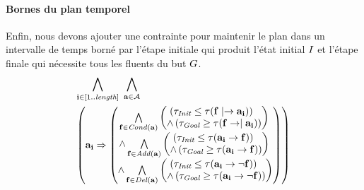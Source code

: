 \paragraph*{Bornes du plan temporel}
Enfin, nous devons ajouter une contrainte pour maintenir le plan dans un intervalle de temps born\'{e} par l'\'{e}tape initiale qui produit l'\'{e}tat initial $I$ et l'\'{e}tape finale qui n\'{e}cessite tous les fluents du but $G$.
\begin{small}
\begin{multline*}
~\\[-2em]
\bigwedge\limits_{\substack{\mathbf{i}\in [1..\mathbf{\length}]}}~\bigwedge\limits_{\substack{\mathbf{\a}\in \mathbf{\A}}}\hfill\\
\left(\mathbf{\a}_{\mathbf{i}} \Rightarrow \begin{pmatrix}\bigwedge\limits_{\substack{\mathbf{\f}\in \cond{\mathbf{\a}}}} \begin{pmatrix}\left(\tau_{\textit{Init}} \leq \tau(\mathbf{\f}\mid\rightarrow\mathbf{\a}_\mathbf{i}) \right)\hfill\\%
 \wedge \left(\tau_{\textit{Goal}} \geq \tau(\mathbf{f}\rightarrow\mid\mathbf{\a}_\mathbf{i})\right) \end{pmatrix}\hfill\\
 \wedge \bigwedge\limits_{\substack{\mathbf{\f}\in \add{\mathbf{\a}}}} \begin{pmatrix}\left(\tau_{\textit{Init}} \leq \tau(\mathbf{\a}_\mathbf{i}\rightarrow \mathbf{\f}) \right)\hfill\\%
 \wedge \left(\tau_{\textit{Goal}} \geq \tau(\mathbf{\a}_\mathbf{i}\rightarrow \mathbf{f})\right) \end{pmatrix}\hfill\\
 \wedge \bigwedge\limits_{\substack{\mathbf{\f}\in \del{\mathbf{\a}}}} \begin{pmatrix}\left(\tau_{\textit{Init}} \leq \tau(\mathbf{\a}_\mathbf{i}\rightarrow \neg \mathbf{\f}) \right)\hfill\\%
 \wedge \left(\tau_{\textit{Goal}} \geq \tau(\mathbf{\a}_\mathbf{i}\rightarrow \neg \mathbf{\f})\right) \end{pmatrix} \end{pmatrix}\right)\\[1em]
\end{multline*}
\end{small}


